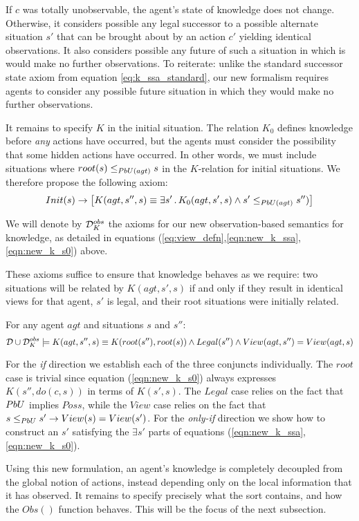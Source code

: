 If $c$ was totally unobservable, the agent's state of knowledge does
not change. Otherwise, it considers possible any legal successor to
a possible alternate situation $s'$ that can be brought about by
an action $c'$ yielding identical observations. It also considers
possible any future of such a situation in which is would make no
further observations. To reiterate: unlike the standard successor
state axiom from equation \eqref{eq:k_ssa_standard}, our new formalism
requires agents to consider any possible future situation in which
they would make no further observations.

It remains to specify $K$ in the initial situation. The relation
$K_{0}$ defines knowledge before \emph{any} actions have occurred,
but the agents must consider the possibility that some hidden actions
have occurred. In other words, we must include situations where $root(s)\leq_{PbU(agt)}s$
in the $K$-relation for initial situations. We therefore propose
the following axiom:\begin{gather}
Init(s)\rightarrow\left[K(agt,s'',s)\equiv\exists s'\,.\, K_{0}(agt,s',s)\wedge s'\leq_{PbU(agt)}s'')\right]\label{eqn:new_k_s0}\end{gather}


\begin{defn}
We will denote by $\mathcal{D}_{K}^{obs}$ the axioms for our new observation-based
semantics for knowledge, as detailed in equations (\ref{eq:view_defn},\ref{eqn:new_k_ssa},\ref{eqn:new_k_s0})
above. 
\end{defn}
These axioms suffice to ensure that knowledge behaves as we require:
two situations will be related by $K(agt,s',s)$ if and only if they
result in identical views for that agent, $s'$ is legal, and their
root situations were initially related.

\begin{thm}
\label{thm:k_obs_equiv} For any agent $agt$ and situations $s$
and $s''$:\[
\mathcal{D}\cup\mathcal{D}_{K}^{obs}\models K(agt,s'',s)\equiv K(root(s''),root(s))\wedge Legal(s'')\wedge View(agt,s'')=View(agt,s)\]

\end{thm}
\begin{proofsketch}
For the \emph{if} direction we establish each of the three conjuncts
individually. The $root$ case is trivial since equation (\ref{eqn:new_k_s0})
always expresses $K(s'',do(c,s))$ in terms of $K(s',s)$. The $Legal$
case relies on the fact that $PbU$ implies $Poss$, while the $View$
case relies on the fact that $s\leq_{PbU}s'\rightarrow View(s)=View(s')$.
For the \emph{only-if} direction we show how to construct an $s'$
satisfying the $\exists s'$ parts of equations (\ref{eqn:new_k_ssa},\ref{eqn:new_k_s0}). 
\end{proofsketch}
Using this new formulation, an agent's knowledge is completely decoupled
from the global notion of actions, instead depending only on the local
information that it has observed. It remains to specify precisely
what the  sort contains, and how the $Obs()$ function
behaves. This will be the focus of the next subsection.


